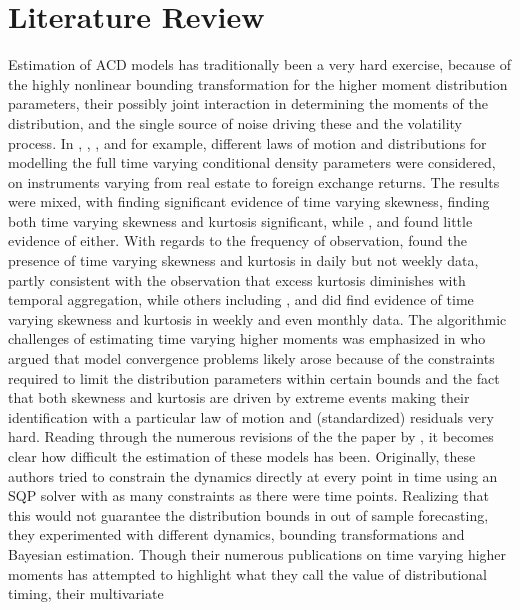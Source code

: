 \section{Literature Review}
Estimation of ACD models has traditionally been a very hard exercise, because of the highly nonlinear bounding transformation for the higher moment distribution
parameters, their possibly joint interaction in determining the moments of the distribution, and the single source of noise driving these and the volatility
process. In \citet{Harvey1999}, \citet{Brooks2005}, \citet{Premaratne2000}, \citet{Rockinger2002} and \citet{Jondeau2003} for example,
different laws of motion and distributions for modelling the full time varying conditional density parameters were considered, on instruments varying from real
estate to foreign exchange returns. The results were mixed, with \citet{Harvey1999} finding significant evidence of time varying skewness,
\citet{Jondeau2003} finding both time varying skewness and kurtosis significant, while \citet{Premaratne2000}, \citet{Brooks2005}
and \citet{Rockinger2002} found little evidence of either. With regards to the frequency of observation, \citet{Jondeau2003} found the
presence of time varying skewness and kurtosis in daily but not weekly data, partly consistent with the observation that excess kurtosis diminishes with
temporal aggregation, while others including \citet{Hansen1994}, \citet{Bond2003} and \citet{Harvey1999} did find evidence of time varying
skewness  and kurtosis in weekly and even monthly data. The algorithmic challenges of estimating time varying higher moments was emphasized in
\citet{Bond2003} who argued that model convergence problems likely arose because of the constraints required to limit the distribution parameters
within certain bounds and the fact that both skewness and kurtosis are driven by extreme events making their identification with a particular
law of motion and (standardized) residuals very hard. Reading through the numerous revisions of the the paper by \citet{Jondeau2003}, it becomes
clear how difficult the estimation of these models has been. Originally, these authors tried to constrain the dynamics directly at every point in time
using an SQP solver with as many constraints as there were time points. Realizing that this would not guarantee the distribution bounds in out of sample
forecasting, they experimented with different dynamics, bounding transformations and Bayesian estimation. Though their numerous publications on
time varying higher moments has attempted to highlight what they call the value of distributional timing, their multivariate
